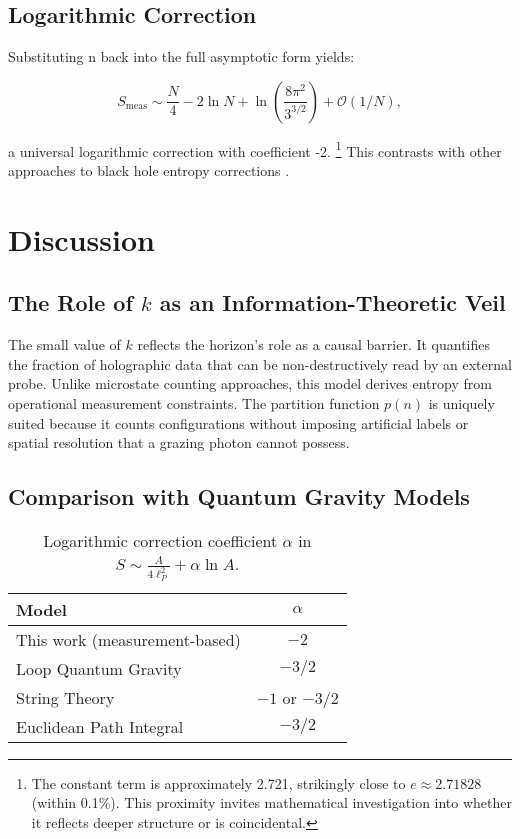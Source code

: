 \documentclass[12pt, letterpaper]{article}
\begin{document}
\subsection{Logarithmic Correction}

Substituting n back into the full asymptotic form yields:

$$
S_{\mathrm{meas}} \sim \frac{N}{4} - 2\ln N + \ln\left(\frac{8\pi^{2}}{3^{3/2}}\right) + \mathcal{O}(1/N),
$$

a universal logarithmic correction with coefficient -2. \footnote{The constant term is approximately 2.721, strikingly close to $e \approx 2.71828$ (within 0.1\%). This proximity invites mathematical investigation into whether it reflects deeper structure or is coincidental.} This contrasts with other approaches to black hole entropy corrections \cite{kaul2000, cardy1986, solodukhin1998}.

\section{Discussion}

\subsection{The Role of $k$ as an Information-Theoretic Veil}

The small value of $k$ reflects the horizon's role as a causal barrier. It quantifies the fraction of holographic data that can be non-destructively read by an external probe. Unlike microstate counting approaches, this model derives entropy from operational measurement constraints. The partition function $p(n)$ is uniquely suited because it counts configurations without imposing artificial labels or spatial resolution that a grazing photon cannot possess.

\subsection{Comparison with Quantum Gravity Models}

\begin{table}[h!]
\centering
\caption{Logarithmic correction coefficient $\alpha$ in $S \sim \frac{A}{4\ell_P^2} + \alpha \ln A$.}
\label{tab:comparison}
\begin{tabular}{lc}
\toprule
\textbf{Model} & $\alpha$ \\
\midrule
This work (measurement-based) & $-2$ \\
Loop Quantum Gravity \cite{kaul2000} & $-3/2$ \\
String Theory \cite{solodukhin1998} & $-1$ or $-3/2$ \\
Euclidean Path Integral \cite{cardy1986} & $-3/2$ \\
\bottomrule
\end{tabular}
\end{table}
\end{document}

